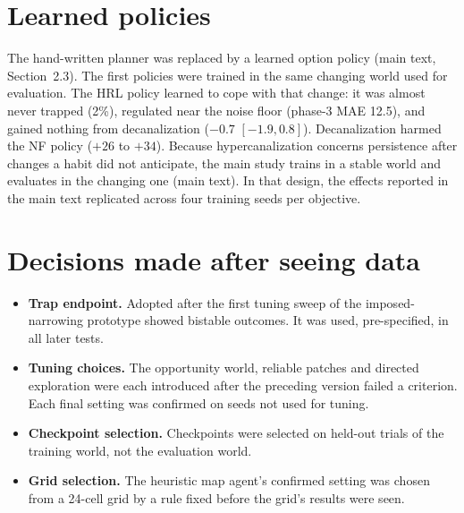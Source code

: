 \documentclass[11pt]{article}
\begin{document}
\section{Learned policies}

The hand-written planner was replaced by a learned option policy (main text, Section~2.3). The first policies were trained in the same changing world used for evaluation. The HRL policy learned to cope with that change: it was almost never trapped (2\%), regulated near the noise floor (phase-3 MAE 12.5), and gained nothing from decanalization ($-0.7$ $[-1.9, 0.8]$). Decanalization harmed the NF policy ($+26$ to $+34$). Because hypercanalization concerns persistence after changes a habit did not anticipate, the main study trains in a stable world and evaluates in the changing one (main text). In that design, the effects reported in the main text replicated across four training seeds per objective.

\section{Decisions made after seeing data}

\begin{itemize}
  \item \textbf{Trap endpoint.} Adopted after the first tuning sweep of the imposed-narrowing prototype showed bistable outcomes. It was used, pre-specified, in all later tests.
  \item \textbf{Tuning choices.} The opportunity world, reliable patches and directed exploration were each introduced after the preceding version failed a criterion. Each final setting was confirmed on seeds not used for tuning.
  \item \textbf{Checkpoint selection.} Checkpoints were selected on held-out trials of the training world, not the evaluation world.
  \item \textbf{Grid selection.} The heuristic map agent's confirmed setting was chosen from a 24-cell grid by a rule fixed before the grid's results were seen.
\end{itemize}
\end{document}
